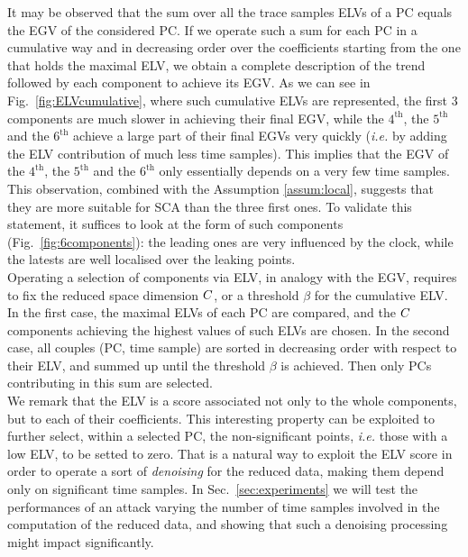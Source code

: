 It may be observed that the sum over all the trace samples ELVs of a PC equals the EGV of the considered PC. If we operate such a sum for each PC in a cumulative way and in decreasing order over the coefficients starting from the one that holds the maximal ELV, we obtain a complete description of the trend followed by each component to achieve its EGV. As we can see in Fig.~\ref{fig:ELVcumulative}, where such cumulative ELVs are represented, the first 3 components are much slower in achieving their final EGV, while the $4^\text{th}$, the $5^\text{th}$ and the $6^\text{th}$ achieve a large part of their final EGVs very quickly ({\em i.e.} by adding the ELV contribution of much less time samples). This implies that the EGV of the $4^\text{th}$, the $5^\text{th}$ and the $6^\text{th}$ only essentially depends on a very few time samples. This observation, combined with the Assumption \ref{assum:local}, suggests that they are more suitable for SCA than the three first ones. To validate this statement, it suffices to look at the form of such components (Fig.~\ref{fig:6components}): the leading ones are very influenced by the clock, while the latests are well localised over the leaking points.\\

Operating a selection of components via ELV, in analogy with the EGV, requires to fix the reduced space dimension $C$, or a threshold $\beta$ for the cumulative ELV. In the first case, the maximal ELVs of each PC are compared, and the $C$ components achieving the highest values of such ELVs are chosen. In the second case, all couples (PC, time sample) are sorted in decreasing order with respect to their ELV, and summed up until the threshold $\beta$ is achieved. Then only PCs contributing in this sum are selected. \\

We remark that the ELV is a score associated not only to the whole components, but to each of their coefficients. This interesting property can be exploited to further select, within a selected PC, the non-significant points, {\em i.e.} those with a low ELV, to be setted to zero. That is a natural way to exploit the ELV score in order to operate a sort of {\em denoising} for the reduced data, making them depend only on significant time samples. In Sec.~\ref{sec:experiments} we will test the performances of an attack varying the number of time samples involved in the computation of the reduced data, and showing that such a denoising processing might impact significantly. 
 


